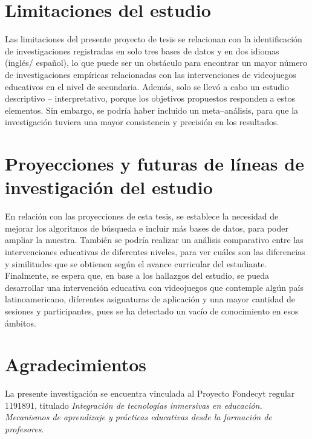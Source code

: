 \documentclass[spanish]{textolivre}
\begin{document}
\section{Limitaciones del estudio}
Las limitaciones del presente proyecto de tesis se relacionan con la identificación de investigaciones registradas en solo tres bases de datos y en dos idiomas (inglés/ español), lo que puede ser un obstáculo para encontrar un mayor número de investigaciones empíricas relacionadas con las intervenciones de videojuegos educativos en el nivel de secundaria. Además, solo se llevó a cabo un estudio descriptivo – interpretativo, porque los objetivos propuestos responden a estos elementos. Sin embargo, se podría haber incluido un meta–análisis, para que la investigación tuviera una mayor consistencia y precisión en los resultados.

\section{Proyecciones y futuras de líneas de investigación del estudio}
En relación con las proyecciones de esta tesis, se establece la necesidad de mejorar los algoritmos de búsqueda e incluir más bases de datos, para poder ampliar la muestra. También se podría realizar un análisis comparativo entre las intervenciones educativas de diferentes niveles, para ver cuáles son las diferencias y similitudes que se obtienen según el avance curricular del estudiante. Finalmente, se espera que, en base a los hallazgos del estudio, se pueda desarrollar una intervención educativa con videojuegos que contemple algún país latinoamericano, diferentes asignaturas de aplicación y una mayor cantidad de sesiones y participantes, pues se ha detectado un vacío de conocimiento en esos ámbitos.

\section{Agradecimientos}
La presente investigación se encuentra vinculada al Proyecto Fondecyt regular 1191891, titulado \textit{Integración de tecnologías inmersivas en educación. Mecanismos de aprendizaje y prácticas educativas desde la formación de profesores}.


\printbibliography\label{sec-bib}
\end{document}
